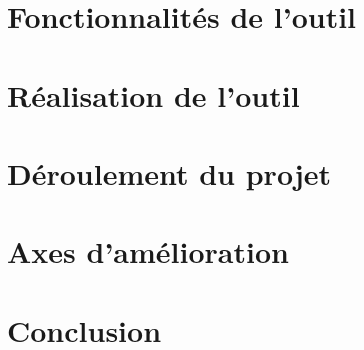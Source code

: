 \documentclass{article}
\begin{document}


\newpage

\section{Fonctionnalités de l'outil}
\bigbreak



\newpage
\section{Réalisation de l'outil}
\bigbreak



\newpage

\section{Déroulement du projet}
\bigbreak 
\bigbreak 



\newpage
\section{Axes d'amélioration}
\bigbreak

\bigbreak

\newpage
\section{Conclusion}
\bigbreak
\bigbreak


\end{document}
